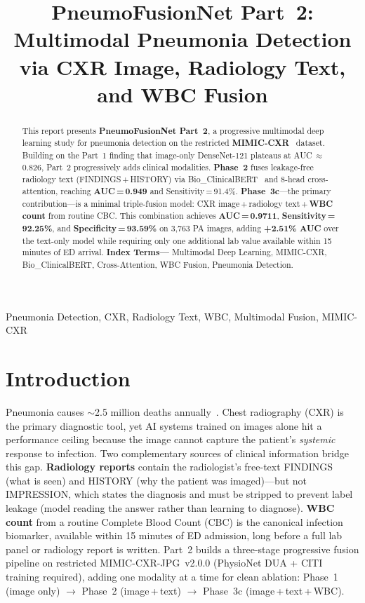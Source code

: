 \documentclass{article}
\title{PneumoFusionNet Part~2: Multimodal Pneumonia Detection\\
via CXR Image, Radiology Text, and WBC Fusion}
\begin{document}
\ninept
\maketitle

\begin{abstract}
This report presents \textbf{PneumoFusionNet Part~2}, a progressive multimodal
deep learning study for pneumonia detection on the restricted
\textbf{MIMIC-CXR}~\cite{johnson2019mimic} dataset.
Building on the Part~1 finding that image-only DenseNet-121 plateaus at
AUC\,$\approx$\,0.826, Part~2 progressively adds clinical modalities.
\textbf{Phase~2} fuses leakage-free radiology text (FINDINGS\,+\,HISTORY)
via Bio\_ClinicalBERT~\cite{alsentzer2019bert} and 8-head cross-attention,
reaching \textbf{AUC\,=\,0.949} and Sensitivity\,=\,91.4\%.
\textbf{Phase~3c}---the primary contribution---is a minimal triple-fusion model:
CXR image\,+\,radiology text\,+\,\textbf{WBC count} from routine CBC.
This combination achieves \textbf{AUC\,=\,0.9711}, \textbf{Sensitivity\,=\,92.25\%},
and \textbf{Specificity\,=\,93.59\%} on 3,763 PA images, adding \textbf{+2.51\% AUC}
over the text-only model while requiring only one additional lab value available
within 15 minutes of ED arrival.
\textbf{Index Terms---} Multimodal Deep Learning, MIMIC-CXR, Bio\_ClinicalBERT,
Cross-Attention, WBC Fusion, Pneumonia Detection.
\end{abstract}

\begin{keywords}
Pneumonia Detection, CXR, Radiology Text, WBC, Multimodal Fusion, MIMIC-CXR
\end{keywords}

\section{Introduction}

Pneumonia causes $\sim$2.5 million deaths annually~\cite{who2023}.
Chest radiography (CXR) is the primary diagnostic tool, yet AI systems
trained on images alone hit a performance ceiling because the image cannot
capture the patient's \emph{systemic} response to infection.
Two complementary sources of clinical information bridge this gap.
\textbf{Radiology reports} contain the radiologist's free-text FINDINGS
(what is seen) and HISTORY (why the patient was imaged)---but not IMPRESSION,
which states the diagnosis and must be stripped to prevent label leakage
(model reading the answer rather than learning to diagnose).
\textbf{WBC count} from a routine Complete Blood Count (CBC) is the canonical
infection biomarker, available within 15 minutes of ED admission, long before
a full lab panel or radiology report is written.
Part~2 builds a three-stage progressive fusion pipeline on restricted
MIMIC-CXR-JPG~v2.0.0 (PhysioNet DUA + CITI training required), adding one
modality at a time for clean ablation:
Phase~1 (image only) $\to$ Phase~2 (image\,+\,text) $\to$
Phase~3c (image\,+\,text\,+\,WBC).
\end{document}
